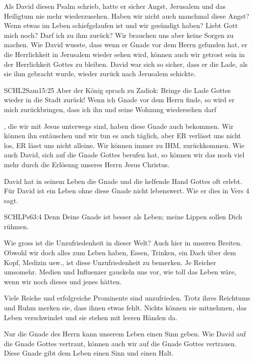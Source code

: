 \documentclass[14pt]{../../inc/mybib}
\begin{document}
    \begin{block}
        Als David diesen Psalm schrieb, hatte er sicher Angst, Jerusalem und das Heiligtum nie mehr wiederzusehen. Haben wir nicht auch manchmal diese Angst? Wenn etwas im Leben schiefgelaufen ist und wir gesündigt haben? Liebt Gott mich  noch? Darf ich  zu ihm zurück? Wir brauchen uns aber keine Sorgen zu machen. Wie David wusste, dass wenn er Gnade vor dem Herrn gefunden hat, er die Herrlichkeit in Jerusalem wieder sehen wird, können auch wir getrost sein in der Herrlichkeit Gottes zu bleiben. David war sich so sicher, dass er die Lade, als sie ihm gebracht wurde, wieder zurück nach Jerusalem schickte.
        \begin{bibelbox}{SCHL}{2Sam}{15:25}
            Aber der König sprach zu Zadiok: Bringe die Lade Gottes wieder in die Stadt zurück! Wenn ich Gnade vor dem Herrn finde, so wird er mich zurückbringen, dass ich ihn und seine Wohnung wiedersehen darf
        \end{bibelbox}
        , die wir mit Jesus unterwegs sind, haben diese Gnade auch bekommen. Wir können ihn entäuschen und wir tun es auch täglich, aber ER verlässt uns nicht los, ER lässt uns nicht alleine. Wir können immer zu IHM,  zurückkommen. Wie auch David, sich auf die Gnade Gottes berufen hat, so können wir das noch viel mehr durch die Erlösung unseres Herrn Jesus Christus.
    \end{block}
    \begin{block}
        David hat in seinem Leben die Gnade und die helfende Hand Gottes oft erlebt. Für David ist ein Leben ohne diese Gnade nicht lebenswert. Wie er dies in Vers 4 sagt.
        \begin{bibelbox}{SCHL}{Ps}{63:4}
            Denn Deine Gnade ist besser als Leben; meine Lippen sollen Dich rühmen.
        \end{bibelbox}
        Wie gross ist die Unzufriedenheit in dieser Welt? Auch hier in unseren Breiten. Obwohl wir doch alles zum Leben haben, Essen, Trinken, ein Dach über dem Kopf, Medizin usw., ist diese Unzufriedenheit zu bemerken. Je Reicher umsomehr. Medien und Influenzer gauckeln uns vor, wie toll das Leben wäre, wenn wir noch dieses und jenes hätten.
        
        Viele Reiche und erfolgreiche Prominente sind unzufrieden. Trotz ihres Reichtums und Ruhm merken sie, dass ihnen etwas fehlt. Nichts können sie mitnehmen, das Leben verschwindet und sie stehen mit leeren Händen da.
        
        Nur die Gnade des Herrn kann unserem Leben einen Sinn geben. Wie David auf die Gnade Gottes vertraut, können auch wir auf die Gnade Gottes vertrauen. Diese Gnade gibt dem Leben einen Sinn und einen Halt. 
    \end{block}
\end{document}
